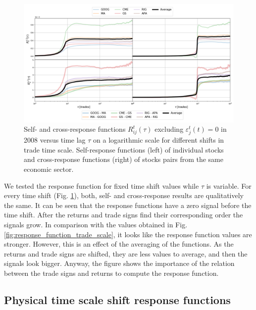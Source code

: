 \begin{figure}[htbp]
    \centering
    \includegraphics[width=\textwidth]{figures/04_shift_responses_trade.png}
    \caption{Self- and cross-response functions $R^{t}_{ij}\left(\tau\right)$
             excluding $\varepsilon^{t}_{j}\left(t\right) = 0$ in 2008 versus
             time lag $\tau$ on a logarithmic scale for different shifts in
             trade time scale. Self-response functions (left) of individual
             stocks and cross-response functions (right) of stocks pairs from
             the same economic sector.}
    \label{fig:shift_responses_trade_scale}
\end{figure}

We tested the response function for fixed time shift values while $\tau$ is
variable. For every time shift (Fig. \ref{fig:shift_responses_trade_scale}),
both, self- and cross-response results are qualitatively the same. It can be
seen that the response functions have a zero signal before the time shift.
After the returns and trade signs find their corresponding order the signals
grow. In comparison with the values obtained in Fig.
\ref{fig:response_function_trade_scale}, it looks like the response function
values are stronger. However, this is an effect of the averaging of the
functions. As the returns and trade signs are shifted, they are less values to
average, and then the signals look bigger. Anyway, the figure shows the
importance of the relation between the trade signs and returns to compute the
response function.

\subsection{Physical time scale shift response functions}
\label{subsec:time_shift_physical}

